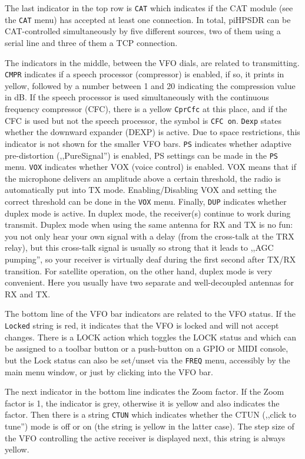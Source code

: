 \documentclass[12pt]{book}
\def\rett#1{\texttt{\color{red}#1}}
\def\bltt#1{\texttt{\color{blue}#1}}
\def\pH{pi\-HPSDR\xspace}
\begin{document}
The last indicator in the top row  is \rett{CAT} which indicates
if the CAT module  (see the \bltt{CAT}  menu) has accepted at least
one connection. In total, \pH can be CAT-controlled simultaneously
by five different sources, two of them using a serial line and
three of them a TCP connection.

The indicators in the middle, between the VFO dials, are related to
transmitting. \rett{CMPR} indicates if a speech processor
(compressor) is enabled, if so, it prints in yellow, followed
by a number between 1 and 20 indicating the compression value in dB.
If the speech processor is used simultaneously with the continuous frequency
compressor (CFC), there is a yellow \rett{CprCfc} at this place, and if
the CFC is used but not the speech processor, the symbol is \rett{CFC on}.
\rett{Dexp} states whether the downward expander (DEXP) is active. Due to space
restrictions, this indicator is not shown for the smaller VFO bars.
\rett{PS} indicates whether adaptive pre-distortion (,,PureSignal'')
is enabled, PS settings can be made in the \bltt{PS} menu.
 \rett{VOX} indicates whether VOX (voice control) is enabled. VOX means
 that if  the microphone delivers an amplitude above a certain threshold,
 the radio is automatically put into TX mode. Enabling/Disabling VOX
 and setting the correct threshold can be done in the \bltt{VOX} menu.
 Finally, \rett{DUP} indicates whether duplex mode is active.
 In duplex mode, the receiver(s) continue to work during transmit. Duplex
 mode when using the same antenna for RX and TX is  no fun: you not only hear
 your own signal with a delay (from the cross-talk at the TRX relay), but
 this cross-talk signal is  usually so strong that it leads to ,,AGC pumping'', so
 your receiver is virtually deaf during the first second after TX/RX
 transition. For satellite operation, on the other hand, duplex  mode
 is very convenient. Here you usually have two separate and well-decoupled
 antennas for RX and TX.

 The bottom line of the VFO bar  indicators are related to the VFO status.
 If the \rett{Locked} string is red, it indicates that the VFO is locked
 and will not accept changes. There is a LOCK action which toggles the
 LOCK status and which can be assigned to a toolbar button or a push-button
 on a GPIO or MIDI console, but the Lock status can also be set/unset
 via the \bltt{FREQ} menu, accessibly by the main menu window, or just by
 clicking into the VFO bar.

The next indicator in the bottom  line indicates the Zoom factor. If the
Zoom factor is 1, the indicator is grey, otherwise it is yellow and
also indicates the factor. Then there is a string \rett{CTUN} which
indicates whether the CTUN (,,click to tune'') mode is off or on (the string
is yellow in the latter case). The step size of the VFO controlling the
active receiver is displayed next, this string is always yellow.
\end{document}
